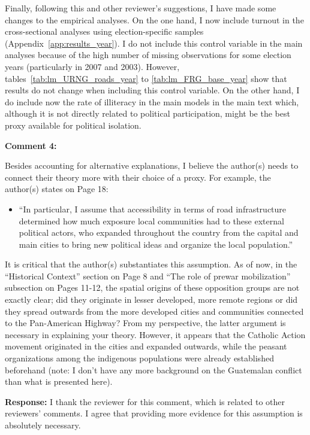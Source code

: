 \documentclass[12pt, a4paper, notitlepage]{article}
\begin{document}
Finally, following this and other reviewer's suggestions, I have made some changes to the empirical analyses. On the one hand, I now include turnout in the cross-sectional analyses using election-specific samples (Appendix~\ref{app:results_year}). I do not include this control variable in the main analyses because of the high number of missing observations for some election years (particularly in 2007 and 2003). However, tables~\ref{tab:lm_URNG_roads_year} to \ref{tab:lm_FRG_base_year} show that results do not change when including this control variable.
On the other hand, I do include now the rate of illiteracy in the main models in the main text which, although it is not directly related to political participation, might be the best proxy available for political isolation.

\vspace{15pt}
\noindent\textbf{Comment 4:}
\begin{displayquote}
Besides accounting for alternative explanations, I believe the author(s) needs to connect their theory more with their choice of a proxy. For example, the author(s) states on Page 18:
\begin{itemize}
  \item[] ``In particular, I assume that accessibility in terms of road infrastructure determined how much exposure local communities had to these external political actors, who expanded throughout the country from the capital and main cities to bring new political ideas and organize the local population.''
\end{itemize}
It is critical that the author(s) substantiates this assumption. As of now, in the “Historical Context” section on Page 8 and “The role of prewar mobilization” subsection on Pages 11-12, the spatial origins of these opposition groups are not exactly clear; did they originate in lesser developed, more remote regions or did they spread outwards from the more developed cities and communities connected to the Pan-American Highway? From my perspective, the latter argument is necessary in explaining your theory. However, it appears that the Catholic Action movement originated in the cities and expanded outwards, while the peasant organizations among the indigenous populations were already established beforehand (note: I don’t have any more background on the Guatemalan conflict than what is presented here).
\end{displayquote}

\noindent\textbf{Response:} I thank the reviewer for this comment, which is related to other reviewers' comments. I agree that providing more evidence for this assumption is absolutely necessary.
\end{document}
